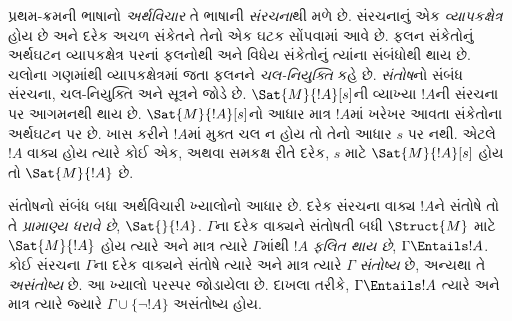 પ્રથમ-ક્રમની ભાષાનો \emph{અર્થવિચાર} તે ભાષાની \emph{સંરચના}થી મળે છે. સંરચનાનું એક \emph{વ્યાપકક્ષેત્ર} હોય છે અને દરેક અચળ સંકેતને તેનો એક ઘટક સોંપવામાં આવે છે. ફલન સંકેતોનું અર્થઘટન વ્યાપકક્ષેત્ર પરનાં ફલનોથી અને વિધેય સંકેતોનું ત્યાંના સંબંધોથી થાય છે. ચલોના ગણમાંથી વ્યાપકક્ષેત્રમાં જતા ફલનને \emph{ચલ-નિયુક્તિ} કહે છે. \emph{સંતોષ}નો સંબંધ સંરચના, ચલ-નિયુક્તિ અને સૂત્રને જોડે છે. $\Sat{M}{!A}[s]$ની વ્યાખ્યા $!A$ની સંરચના પર આગમનથી થાય છે. $\Sat{M}{!A}[s]$નો આધાર માત્ર $!A$માં ખરેખર આવતા સંકેતોના અર્થઘટન પર છે. ખાસ કરીને $!A$માં મુક્ત ચલ ન હોય તો તેનો આધાર $s$ પર નથી. એટલે $!A$ વાક્ય હોય ત્યારે કોઈ એક, અથવા સમકક્ષ રીતે દરેક, $s$ માટે $\Sat{M}{!A}[s]$ હોય તો $\Sat{M}{!A}$ છે.

સંતોષનો સંબંધ બધા અર્થવિચારી ખ્યાલોનો આધાર છે. દરેક સંરચના વાક્ય $!A$ને સંતોષે તો તે \emph{પ્રામાણ્ય ધરાવે છે}, $\Sat{{}}{!A}$. $\Gamma$ના દરેક વાક્યને સંતોષતી બધી $\Struct{M}$ માટે $\Sat{M}{!A}$ હોય ત્યારે અને માત્ર ત્યારે $\Gamma$માંથી $!A$ \emph{ફલિત થાય છે}, $\Gamma\Entails !A$. કોઈ સંરચના $\Gamma$ના દરેક વાક્યને સંતોષે ત્યારે અને માત્ર ત્યારે $\Gamma$ \emph{સંતોષ્ય} છે, અન્યથા તે \emph{અસંતોષ્ય} છે. આ ખ્યાલો પરસ્પર જોડાયેલા છે. દાખલા તરીકે, $\Gamma\Entails !A$ ત્યારે અને માત્ર ત્યારે જ્યારે $\Gamma\cup\{\lnot !A\}$ અસંતોષ્ય હોય.
